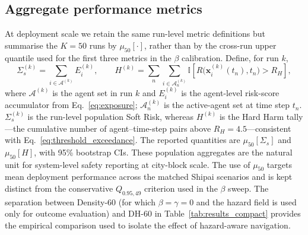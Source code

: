 \documentclass[preprint,12pt]{elsarticle}
\providecommand{\FloatBarrier}{}
\let\origsubsection\subsection
\renewcommand{\subsection}{\FloatBarrier\origsubsection}
\begin{document}
\subsection{Aggregate performance metrics}
\label{sec:shipai_metrics}

At deployment scale we retain the same run-level metric definitions but
summarise the $K=50$ runs by $\mu_{50}[\cdot]$, rather than by the
cross-run upper quantile used for the first three metrics in the
$\beta$ calibration. Define, for run $k$,
\begin{equation}
\Sigma_s^{(k)} = \sum_{i \in \mathcal{A}^{(k)}} E_i^{(k)},
\qquad
H^{(k)} = \sum_n\sum_{i\in\mathcal{A}_n^{(k)}}
\mathbb{I}\!\left[
R\!\big(\mathbf{x}_i^{(k)}(t_n),t_n\big)>R_H
\right],
\label{eq:cum_metrics}
\end{equation}
where $\mathcal{A}^{(k)}$ is the agent set in run $k$ and $E_i^{(k)}$ is the
agent-level risk-score accumulator from Eq.~\eqref{eq:exposure};
$\mathcal{A}_n^{(k)}$ is the active-agent set at time step $t_n$.
$\Sigma_s^{(k)}$ is the run-level population Soft Risk, whereas
$H^{(k)}$ is the Hard Harm tally---the cumulative number of
agent--time-step pairs above $R_H=4.5$---consistent
with Eq.~\eqref{eq:threshold_exceedance}. The reported quantities are
$\mu_{50}[\Sigma_s]$ and $\mu_{50}[H]$, with 95\% bootstrap CIs. These
population aggregates are the natural unit for system-level safety
reporting at city-block scale. The use of $\mu_{50}$ targets mean
deployment performance across the matched Shipai scenarios and is kept
distinct from the conservative $Q_{0.95,49}$ criterion used in the
$\beta$ sweep. The separation between Density-60 (for which
$\beta=\gamma=0$ and the hazard field is used only for outcome
evaluation) and DH-60 in
Table~\ref{tab:results_compact} provides the empirical comparison used to
isolate the effect of hazard-aware navigation.
\end{document}
